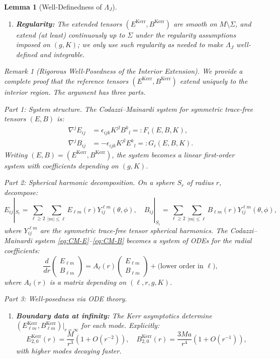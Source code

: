 \documentclass[12pt]{article}
\theoremstyle{plain}
\newtheorem{lemma}[theorem]{Lemma}
\theoremstyle{definition}
\theoremstyle{remark}
\newtheorem{remark}[theorem]{Remark}
\begin{document}
\begin{lemma}[Well-Definedness of $\Lambda_J$]
\begin{enumerate}[label=\textup{(\roman*)}]
    \item \textbf{Regularity:} The extended tensors $(E^{\mathrm{Kerr}}, B^{\mathrm{Kerr}})$ are smooth on $M \setminus \Sigma$, and extend (at least) continuously up to $\Sigma$ under the regularity assumptions imposed on $(g,K)$; we only use such regularity as needed to make $\Lambda_J$ well-defined and integrable.
\end{enumerate}

\begin{remark}[Rigorous Well-Posedness of the Interior Extension]
We provide a complete proof that the reference tensors $(E^{\mathrm{Kerr}}, B^{\mathrm{Kerr}})$ extend uniquely to the interior region. The argument has three parts.

\textit{Part 1: System structure.} The Codazzi--Mainardi system for symmetric trace-free tensors $(E, B)$ is:
\begin{align}
\nabla^j E_{ij} &= \epsilon_{ijk}K^{jl}B^k{}_l =: F_i(E, B, K), \label{eq:CM-E}\\
\nabla^j B_{ij} &= -\epsilon_{ijk}K^{jl}E^k{}_l =: G_i(E, B, K). \label{eq:CM-B}
\end{align}
Writing $(E, B) = (E^{\mathrm{Kerr}}, B^{\mathrm{Kerr}})$, the system becomes a \emph{linear} first-order system with coefficients depending on $(g, K)$.

\textit{Part 2: Spherical harmonic decomposition.} On a sphere $S_r$ of radius $r$, decompose:
\[
E_{ij}|_{S_r} = \sum_{\ell \geq 2} \sum_{|m| \leq \ell} E_{\ell m}(r) Y^{\ell m}_{ij}(\theta, \phi), \quad
B_{ij}|_{S_r} = \sum_{\ell \geq 2} \sum_{|m| \leq \ell} B_{\ell m}(r) Y^{\ell m}_{ij}(\theta, \phi),
\]
where $Y^{\ell m}_{ij}$ are the symmetric trace-free tensor spherical harmonics. The Codazzi--Mainardi system \eqref{eq:CM-E}--\eqref{eq:CM-B} becomes a system of ODEs for the radial coefficients:
\begin{equation}\label{eq:radial-ODE}
\frac{d}{dr}\begin{pmatrix} E_{\ell m} \\ B_{\ell m} \end{pmatrix} = A_\ell(r) \begin{pmatrix} E_{\ell m} \\ B_{\ell m} \end{pmatrix} + \text{(lower order in } \ell),
\end{equation}
where $A_\ell(r)$ is a matrix depending on $(\ell, r, g, K)$.

\textit{Part 3: Well-posedness via ODE theory.} 
\begin{enumerate}[label=(\alph*)]
    \item \textbf{Boundary data at infinity:} The Kerr asymptotics determine $(E^{\mathrm{Kerr}}_{\ell m}, B^{\mathrm{Kerr}}_{\ell m})|_{r=\infty}$ for each mode. Explicitly:
    \[
    E^{\mathrm{Kerr}}_{2,0}(r) = \frac{M}{r^3}(1 + O(r^{-2})), \quad B^{\mathrm{Kerr}}_{2,0}(r) = \frac{3Ma}{r^4}(1 + O(r^{-1})),
    \]
    with higher modes decaying faster.
    

\end{enumerate}
\end{remark}
\end{lemma}
\end{document}
